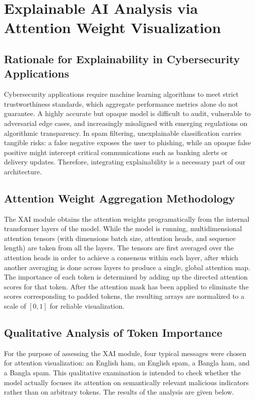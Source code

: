 \documentclass[journal]{IEEEtran}
\begin{document}
\section{Explainable AI Analysis via Attention Weight Visualization}

\subsection{Rationale for Explainability in Cybersecurity Applications}

Cybersecurity applications require machine learning algorithms to meet strict trustworthiness standards, which aggregate performance metrics alone do not guarantee. A highly accurate but opaque model is difficult to audit, vulnerable to adversarial edge cases, and increasingly misaligned with emerging regulations on algorithmic transparency. In spam filtering, unexplainable classification carries tangible risks: a false negative exposes the user to phishing, while an opaque false positive might intercept critical communications such as banking alerts or delivery updates. Therefore, integrating explainability is a necessary part of our architecture.

\subsection{Attention Weight Aggregation Methodology}

The XAI module obtains the attention weights programatically from the internal transformer layers of the model. While the model is running, multidimensional attention tensors (with dimensions batch size, attention heads, and sequence length) are taken from all the layers. The tensors are first averaged over the attention heads in order to achieve a consensus within each layer, after which another averaging is done across layers to produce a single, global attention map. The importance of each token is determined by adding up the directed attention scores for that token. After the attention mask has been applied to eliminate the scores corresponding to padded tokens, the resulting arrays are normalized to a scale of $[0, 1]$ for reliable visualization.

\subsection{Qualitative Analysis of Token Importance}

For the purpose of assessing the XAI module, four typical messages were chosen for attention visualization: an English ham, an English spam, a Bangla ham, and a Bangla spam. This qualitative examination is intended to check whether the model actually focuses its attention on semantically relevant malicious indicators rather than on arbitrary tokens. The results of the analysis are given below.
\end{document}
